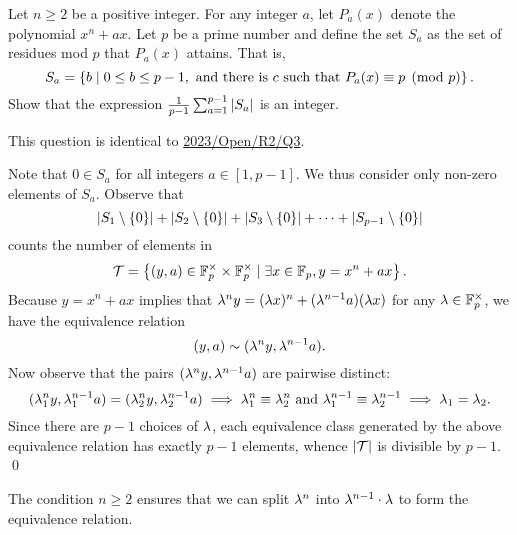 \begin{question}\label{Q::2022-O-2-5}
    Let $n \geq 2$ be a positive integer. For any integer $a$, let $P_a(x)$ denote the polynomial $x^n + ax$. Let $p$ be a prime number and define the set $S_a$ as the set of residues mod $p$ that $P_a(x)$ attains. That is, \[S_a = \left\lbrace b \mid 0 \leq b \leq p -1, \text{ and there is $c$ such that $P_a(x) \equiv p \pmod{p}$} \right\rbrace.\] Show that the expression $\frac1{p-1} \sum_{a=1}^{p-1} \left\lvert S_a \right\rvert$ is an integer.
\end{question}
\begin{remark}
    This question is identical to \hyperref[Q::2023-O-2-3]{2023/Open/R2/Q3}.
\end{remark}
\begin{solution*}
    Note that $0 \in S_a$ for all integers $a \in [1, p-1]$. We thus consider only non-zero elements of $S_a$. Observe that \[\left\lvert S_1 \setminus \left\lbrace 0 \right\rbrace \right\rvert + \left\lvert S_2 \setminus \left\lbrace 0 \right\rbrace \right\rvert + \left\lvert S_3 \setminus \left\lbrace 0 \right\rbrace \right\rvert + \cdots + \left\lvert S_{p-1} \setminus \left\lbrace 0 \right\rbrace \right\rvert\] counts the number of elements in \[\mathcal{T} = \left\lbrace (y, a) \in \mathbb{F}_p^\times \times \mathbb{F}_p^\times \mid \exists x \in \mathbb{F}_p, y = x^n + ax \right\rbrace.\] Because $y = x^n + ax$ implies that $\lambda^n y = (\lambda x)^n + (\lambda^{n-1} a)(\lambda x)$ for any $\lambda \in \mathbb{F}_p^\times$, we have the equivalence relation \[(y, a) \sim (\lambda^n y, \lambda^{n-1} a).\] Now observe that the pairs $(\lambda^n y, \lambda^{n-1} a)$ are pairwise distinct: \[(\lambda_1^n y, \lambda_1^{n-1} a) = (\lambda_2^n y, \lambda_2^{n-1} a) \implies \lambda_1^n \equiv \lambda_2^n \text{ and } \lambda_1^{n-1} \equiv \lambda_2^{n-1} \implies \lambda_1 = \lambda_2.\] Since there are $p-1$ choices of $\lambda$, each equivalence class generated by the above equivalence relation has exactly $p-1$ elements, whence $\left\lvert \mathcal{T} \right\rvert$ is divisible by $p-1$. \qed

    \begin{remark}
        The condition $n \geq 2$ ensures that we can split $\lambda^n$ into $\lambda^{n-1} \cdot \lambda$ to form the equivalence relation.
    \end{remark}
\end{solution*}
